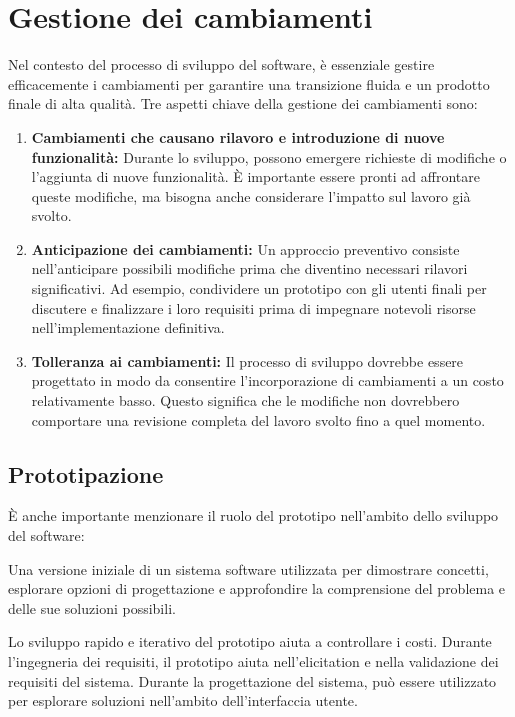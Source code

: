 \section{Gestione dei cambiamenti}
Nel contesto del processo di sviluppo del software, è essenziale gestire efficacemente
i cambiamenti per garantire una transizione fluida e un prodotto finale di alta qualità.
Tre aspetti chiave della gestione dei cambiamenti sono:

\begin{enumerate}
    \item \textbf{Cambiamenti che causano rilavoro e introduzione di nuove funzionalità:}
    Durante lo sviluppo, possono emergere richieste di modifiche o l'aggiunta di nuove
    funzionalità. È importante essere pronti ad affrontare queste modifiche,
    ma bisogna anche considerare l'impatto sul lavoro già svolto.
    
    \item \textbf{Anticipazione dei cambiamenti:} Un approccio preventivo consiste
    nell'anticipare possibili modifiche prima che diventino necessari
    rilavori significativi. Ad esempio, condividere un prototipo con gli utenti finali
    per discutere e finalizzare i loro requisiti prima di impegnare notevoli risorse
    nell'implementazione definitiva.
    
    \item \textbf{Tolleranza ai cambiamenti:} Il processo di sviluppo dovrebbe essere
    progettato in modo da consentire l'incorporazione di cambiamenti a un costo
    relativamente basso. Questo significa che le modifiche non dovrebbero comportare
    una revisione completa del lavoro svolto fino a quel momento.
\end{enumerate}
\subsection{Prototipazione}
È anche importante menzionare il ruolo del prototipo nell'ambito dello
sviluppo del software:
\begin{tcolorbox}[title = Prototipo]
Una versione iniziale di un sistema software
utilizzata per dimostrare concetti, esplorare opzioni di progettazione
e approfondire la comprensione del problema e delle sue soluzioni possibili.
\end{tcolorbox}
Lo sviluppo rapido e iterativo del prototipo aiuta a controllare i costi.
Durante l'ingegneria dei requisiti, il prototipo aiuta nell'elicitation e
nella validazione dei requisiti del sistema. Durante la progettazione del
sistema, può essere utilizzato per esplorare soluzioni nell'ambito dell'interfaccia
utente.
